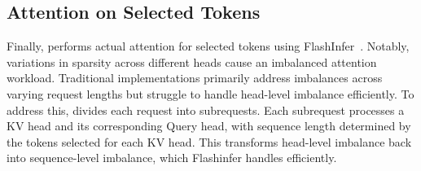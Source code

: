 \subsection{Attention on Selected Tokens}
Finally, \sys performs actual attention for selected tokens using FlashInfer~\cite{ye2025flashinfer}.
Notably, variations in sparsity across different heads cause an imbalanced attention workload. Traditional implementations primarily address imbalances across varying request lengths but struggle to handle head-level imbalance efficiently. To address this, \sys divides each request into subrequests. Each subrequest processes a KV head and its corresponding Query head, with sequence length determined by the tokens selected for each KV head. This transforms head-level imbalance back into sequence-level imbalance, which Flashinfer handles efficiently.
